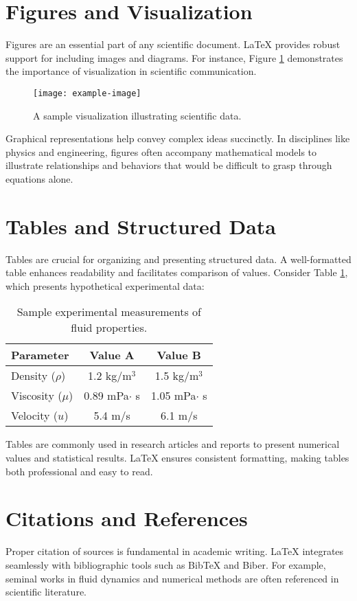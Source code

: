 \section{Figures and Visualization}
Figures are an essential part of any scientific document. LaTeX provides robust support for including images and diagrams. For instance, Figure \ref{fig:example} demonstrates the importance of visualization in scientific communication.
\begin{figure}[h]
    \centering
    \texttt{[image: example-image]}
    \caption{A sample visualization illustrating scientific data.}
    \label{fig:example}
\end{figure}

Graphical representations help convey complex ideas succinctly. In disciplines like physics and engineering, figures often accompany mathematical models to illustrate relationships and behaviors that would be difficult to grasp through equations alone.

\section{Tables and Structured Data}
Tables are crucial for organizing and presenting structured data. A well-formatted table enhances readability and facilitates comparison of values. Consider Table \ref{tab:example}, which presents hypothetical experimental data:
\begin{table}[h]
    \centering
    \begin{tabular}{lcc}
        \toprule
        Parameter & Value A & Value B \\
        \midrule
        Density ($\rho$) & 1.2 kg/m$^3$ & 1.5 kg/m$^3$ \\
        Viscosity ($\mu$) & 0.89 mPa$\cdot$ s & 1.05 mPa$\cdot$ s \\
        Velocity ($u$) & 5.4 m/s & 6.1 m/s \\
        \bottomrule
    \end{tabular}
    \caption{Sample experimental measurements of fluid properties.}
    \label{tab:example}
\end{table}

Tables are commonly used in research articles and reports to present numerical values and statistical results. LaTeX ensures consistent formatting, making tables both professional and easy to read.

\section{Citations and References}
Proper citation of sources is fundamental in academic writing. LaTeX integrates seamlessly with bibliographic tools such as BibTeX and Biber. For example, seminal works in fluid dynamics \cite{batchelor1967} and numerical methods \cite{press2007} are often referenced in scientific literature.


